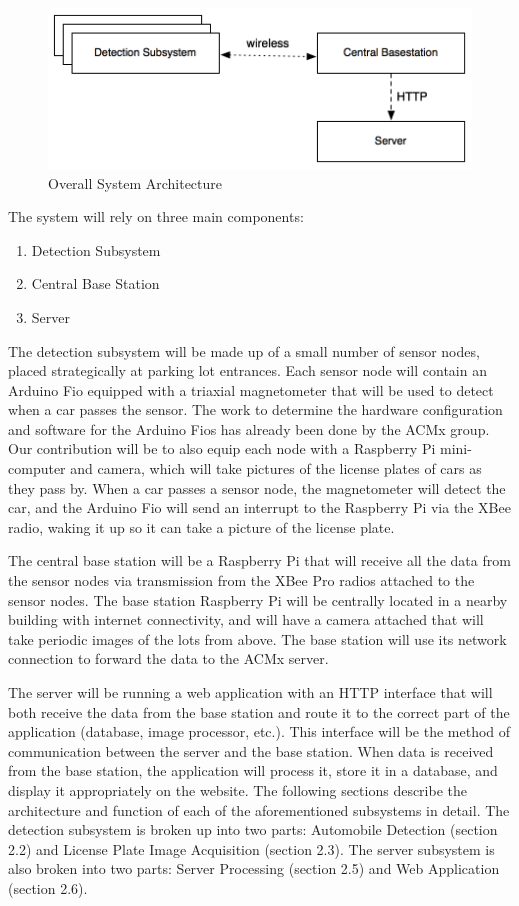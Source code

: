 \documentclass[11pt, oneside, fullpage, doublespace]{article}
\begin{document}
\begin{figure}
\begin{center}
\includegraphics[width=4.5in]{architecture}
\end{center}
\caption{Overall System Architecture}
\label{fig:system}
\end{figure}

The system will rely on three main components:
\begin{enumerate}
\item Detection Subsystem
\item Central Base Station
\item Server
\end{enumerate}
The detection subsystem will be made up of a small number of sensor nodes, placed strategically at parking lot entrances. Each sensor node will contain an Arduino Fio equipped with a triaxial magnetometer that will be used to detect when a car passes the sensor. The work to determine the hardware configuration and software for the Arduino Fios has already been done by the ACMx group. Our contribution will be to also equip each node with a Raspberry Pi mini-computer and camera, which will take pictures of the license plates of cars as they pass by. When a car passes a sensor node, the magnetometer will detect the car, and the Arduino Fio will send an interrupt to the Raspberry Pi via the XBee radio, waking it up so it can take a picture of the license plate.

The central base station will be a Raspberry Pi that will receive all the data from the sensor nodes via transmission from the XBee Pro radios attached to the sensor nodes. The base station Raspberry Pi will be centrally located in a nearby building with internet connectivity, and will have a camera attached that will take periodic images of the lots from above. The base station will use its network connection to forward the data to the ACMx server.

The server will be running a web application with an HTTP interface that will both receive the data from the base station and route it to the correct part of the application (database, image processor, etc.). This interface will be the method of communication between the server and the base station. When data is received from the base station, the application will process it, store it in a database, and display it appropriately on the website. The following sections describe the architecture and function of each of the aforementioned subsystems in detail. The detection subsystem is broken up into two parts: Automobile Detection (section 2.2) and License Plate Image Acquisition (section 2.3). The server subsystem is also broken into two parts: Server Processing (section 2.5) and Web Application (section 2.6).
\end{document}
